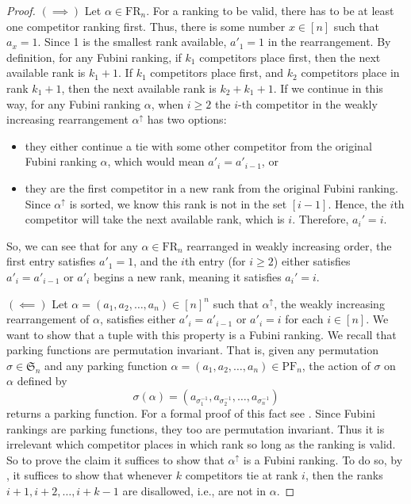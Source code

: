 \documentclass{amsart}
\theoremstyle{definition}
\theoremstyle{definition}
\theoremstyle{remark}
\newcommand{\PF}[1]{\mathrm{PF}_{#1}}
\newcommand{\FR}[1]{\mathrm{FR}_{#1}}
\newcommand{\Sym}{\mathfrak{S}}
\begin{document}
\begin{proof}
    $(\implies)$ Let $\alpha\in\FR{n}$.  
    For a ranking to be valid, there has to be at least one competitor ranking first. Thus, there is some number $x \in [n]$ such that $a_x = 1$. Since 1 is the smallest rank available, $a'_1=1$ in the rearrangement.
    By definition, for any Fubini ranking, if $k_1$ competitors place first, then the next available rank is $k_1+1$. If $k_1$ competitors place first, and $k_2$ competitors place in rank $k_1+1$, then the next available rank is $k_2+k_1+1$. 
    If we continue in this way, for any Fubini ranking $\alpha$, when $i\geq 2$ the $i$-th competitor in the weakly increasing rearrangement $\alpha^\uparrow$  has two options:
    \begin{itemize}
        \item they either continue a tie with some other competitor from the original Fubini ranking $\alpha$, which would mean $a'_{i} = a'_{i-1}$, or
        \item they are the first competitor in a new rank from the original Fubini ranking. Since $\alpha^\uparrow$ is sorted, we know this rank is not in the set $[i-1]$. Hence, the $i$th competitor will take the next available rank, which is $i$. Therefore, $a_i' = i$.
    \end{itemize} 
    So, we can see that for any $\alpha\in \FR{n}$ rearranged in weakly increasing order, the first entry satisfies $a'_1=1$, and the $i$th entry (for $i\geq 2$) either satisfies $a'_i=a'_{i-1}$ or $a'_i$ begins a new rank, meaning it satisfies $a_i'=i$. 
    
    \noindent $(\impliedby)$ Let $\alpha=(a_1,a_2,\ldots, a_n)\in[n]^n$ such that $\alpha^\uparrow$, the weakly increasing rearrangement of $\alpha$, satisfies either $a'_i=a'_{i-1}$ or $a'_i=i$ for each $i\in[n]$.
    We want to show that a tuple with this property is a Fubini ranking. 
    We recall that parking functions are permutation invariant. That is, given any permutation $\sigma\in\Sym_{n}$
and any parking function $\alpha=(a_1,a_2,\ldots,a_n)\in\PF{n}$, the action of $\sigma$ on $\alpha$ defined by 
\[\sigma (\alpha)=(a_{\sigma_1^{-1}},a_{\sigma_2^{-1}},\ldots,a_{\sigma_n^{-1}})\]
returns a parking function. For a formal proof of this fact see \cite[Theorem 3.2]{costsharing}.
    Since Fubini rankings are parking functions, they too are permutation invariant. Thus it is irrelevant which competitor places in which rank so long as the ranking is valid. 
    So to prove the claim it suffices to show that $\alpha^\uparrow$ is a Fubini ranking.
    To do so, by , it suffices to show that whenever $k$ competitors tie at rank $i$, then the ranks $i+1,i+2,\ldots,i+k-1$ are disallowed, i.e., are not in $\alpha$.
    

\end{proof}
\end{document}
